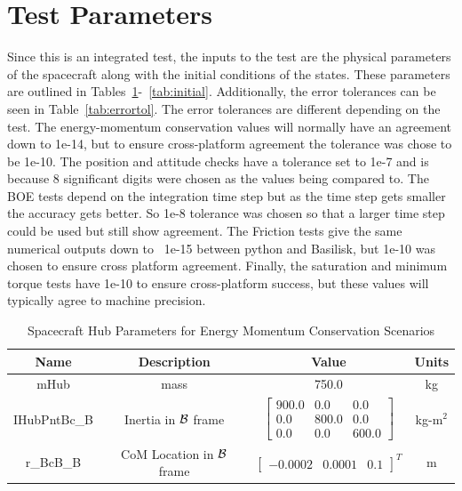 \section{Test Parameters}

Since this is an integrated test, the inputs to the test are the physical parameters of the spacecraft along with the initial conditions of the states. These parameters are outlined in Tables~\ref{tab:hub}-~\ref{tab:initial}. Additionally, the error tolerances can be seen in Table~\ref{tab:errortol}. The error tolerances are different depending on the test. The energy-momentum conservation values will normally have an agreement down to 1e-14, but to ensure cross-platform agreement the tolerance was chose to be 1e-10. The position and attitude checks have a tolerance set to 1e-7 and is because 8 significant digits were chosen as the values being compared to. The BOE tests depend on the integration time step but as the time step gets smaller the accuracy gets better. So 1e-8 tolerance was chosen so that a larger time step could be used but still show agreement. The Friction tests give the same numerical outputs down to ~1e-15 between python and Basilisk, but 1e-10 was chosen to ensure cross platform agreement. Finally, the saturation and minimum torque tests have 1e-10 to ensure cross-platform success, but these values will typically agree to machine precision. 

\begin{table}[htbp]
	\caption{Spacecraft Hub Parameters for Energy Momentum Conservation Scenarios}
	\label{tab:hub}
	\centering \fontsize{10}{10}\selectfont
	\begin{tabular}{ c | c | c | c } %
		\hline
		\textbf{Name}  & \textbf{Description}  & \textbf{Value} & \textbf{Units} \\
		\hline
		mHub  & mass & 750.0 & kg \\
		IHubPntBc\_B & Inertia in $\cal{B}$ frame & $\begin{bmatrix}
		900.0 & 0.0 & 0.0\\
		0.0 & 800.0 & 0.0\\
		0.0 & 0.0 & 600.0
		\end{bmatrix}$ & kg-m$^2$ \\
		r\_BcB\_B & CoM Location in $\cal{B}$ frame & $\begin{bmatrix}
		-0.0002 & 0.0001 & 0.1 \end{bmatrix}^T$ & m \\
		\hline
	\end{tabular}
\end{table}


